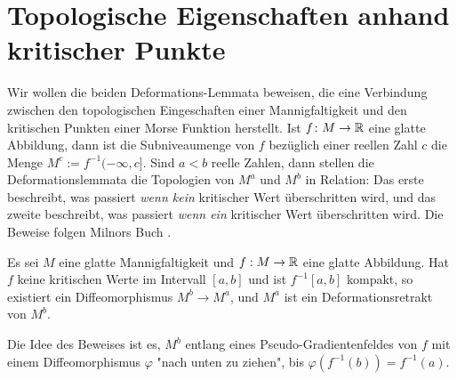\section{Topologische Eigenschaften anhand kritischer Punkte}
\label{sec: topologische eigenschaften anhand kritischer punkte}

Wir wollen die beiden Deformations-Lemmata beweisen, die eine Verbindung zwischen den topologischen
Eingeschaften einer Mannigfaltigkeit und den kritischen Punkten einer Morse Funktion herstellt.
Ist $f \colon M \to { \mathbb R }$ eine glatte Abbildung, dann ist die Subniveaumenge von $f$ bezüglich 
einer reellen Zahl $c$ die Menge $M^c := f^{-1}(- \infty, c]$. Sind $a < b$ reelle Zahlen, dann
stellen die Deformationslemmata die Topologien von $M^a$ und $M^b$ in Relation: Das erste beschreibt, 
was passiert \textit{wenn kein} kritischer Wert überschritten wird, und das zweite beschreibt, was 
passiert \textit{wenn ein} kritischer Wert überschritten wird. Die Beweise folgen Milnors Buch 
\cite{morse}. \\

\begin{theorem}
    \label{satz: erstes deformationslemma}
    Es sei $M$ eine glatte Mannigfaltigkeit und $f: M \rightarrow { \mathbb R }$ eine
    glatte Abbildung. Hat $f$ keine kritischen Werte im Intervall $[a, b]$ und 
    ist $f^{-1}[a, b]$ kompakt, so existiert ein Diffeomorphismus 
    $M^b \rightarrow M^a$, und $M^a$ ist ein Deformationsretrakt von $M^b$.
\end{theorem}

Die Idee des Beweises ist es, $M^b$ entlang eines Pseudo-Gradientenfeldes von $f$ mit einem 
Diffeomorphismus $\varphi$ "nach unten zu ziehen", bis $\varphi(f^{-1}(b)) = f^{-1}(a)$.

